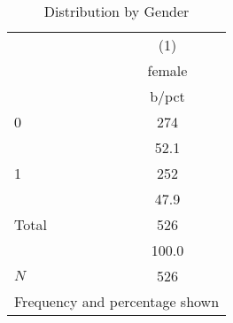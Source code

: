 \begin{table}[htbp]\centering
\def\sym#1{\ifmmode^{#1}\else\(^{#1}\)\fi}
\caption{Distribution by Gender}\label{tab:0201-female_frequency}
\begin{tabular}{l*{1}{c}}
\toprule
            &\multicolumn{1}{c}{(1)}\\
            &\multicolumn{1}{c}{female}\\
            &       b/pct\\
\midrule
0           &         274\\
            &        52.1\\
1           &         252\\
            &        47.9\\
Total       &         526\\
            &       100.0\\
\midrule
\(N\)       &         526\\
\bottomrule
\multicolumn{2}{l}{\footnotesize Frequency and percentage shown}\\
\end{tabular}
\end{table}
